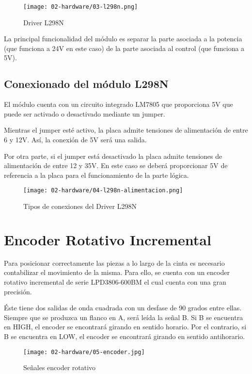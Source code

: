 \begin{figure}[hbtp]
	\centering
	\texttt{[image: 02-hardware/03-l298n.png]}
	\caption{Driver L298N}
	\label{fig:figura23}
	\end{figure}

La principal funcionalidad del módulo es separar la parte asociada
a la potencia (que funciona a 24V en este caso) de la parte asociada
al control (que funciona a 5V).

\subsection{Conexionado del módulo L298N}

El módulo cuenta con un circuito integrado LM7805 que proporciona 5V
que puede ser activado o desactivado mediante un jumper.

Mientras el jumper esté activo, la placa admite tensiones de 
alimentación de entre 6 y 12V. Así, la conexión de 5V será una salida.

Por otra parte, si el jumper está desactivado la placa admite tensiones
de alimentación de entre 12 y 35V. En este caso se deberá proporcionar
5V de referencia a la placa para el funcionamiento de la parte lógica.

\begin{figure}[hbtp]
	\centering
	\texttt{[image: 02-hardware/04-l298n-alimentacion.png]}
	\caption{Tipos de conexiones del Driver L298N}
	\label{fig:figura24}
	\end{figure}

\section{Encoder Rotativo Incremental}

Para posicionar correctamente las piezas a lo largo de la cinta es
necesario contabilizar el movimiento de la misma. Para ello, se cuenta
con un encoder rotativo incremental de serie LPD3806-600BM el cual
cuenta con una gran precisión.

Éste tiene dos salidas de onda cuadrada con un desfase de 90 grados
entre ellas. Siempre que se produzca un flanco en A, será leída la 
señal B. Si B se encuentra en HIGH, el encoder se encontrará girando
en sentido horario. Por el contrario, si B se encuentra en LOW, el 
encoder se encontrará girando en sentido antihorario. 

\begin{figure}[hbtp]
	\centering
	\texttt{[image: 02-hardware/05-encoder.jpg]}
	\caption{Señales encoder rotativo}
	\label{fig:figura25}
	\end{figure}

